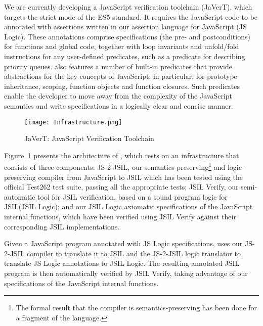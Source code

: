 \documentclass{llncs}
\newcommand{\jsil}{JSIL\xspace}
\newcommand{\JSComp}{JS-2-JSIL\xspace}
\newif\ifComments
\newcommand{\pg}[1]{%
\ifComments
\begin{center}
\fbox{%
\begin{minipage}{\textwidth} \color{red}
{\bf PG:} {\rm #1}
\end{minipage}
}
\end{center}
\fi
}
\begin{document}
We are currently developing a JavaScript verification toolchain
(JaVerT), which targets the strict mode of the ES5 standard.
It requires
the JavaScript code to be annotated with assertions written in our
assertion language for JavaScript (JS Logic).  These annotations
comprise specifications (the pre- and postconditions) for
functions and global code, together with loop invariants and unfold/fold instructions
for any user-defined predicates, such as a predicate for describing
priority queues. 
\javert also  features a number of built-in predicates that provide abstractions for the key concepts of JavaScript; 
in particular, for prototype inheritance, scoping, function objects and function closures. 
Such predicates enable the developer  to move away from the complexity of the JavaScript semantics and write specifications in a logically clear and concise manner.

\begin{figure}[!h]
\centering
\texttt{[image: Infrastructure.png]}
\vspace*{-0.2cm}
\caption{JaVerT: JavaScript Verification Toolchain}
\label{fig:javert}
\end{figure}


Figure~\ref{fig:javert} presents the architecture of \javert, which 
rests on an infrastructure that consists of three components: 
\JSComp, our semantics-preserving\footnote{The formal result
  that the compiler is semantics-preserving has been done for a
 fragment of the language.} and logic-preserving compiler from JavaScript to
\jsil which has been tested using the official Test262 test suite,
passing all the appropriate tests;  JSIL Verify, our semi-automatic tool for \jsil
verification, based on 
a sound program logic for \jsil (\jsil Logic); and  our 
JSIL Logic axiomatic specifications of the JavaScript internal functions, 
which have been verified using JSIL Verify against their
corresponding \jsil implementations.  


Given a JavaScript program annotated with JS Logic specifications, \javert uses our \JSComp compiler to translate it to \jsil and the \JSComp logic translator to translate JS Logic annotations to \jsil Logic.
The resulting annotated JSIL program is then automatically verified by
JSIL Verify, taking advantage of our specifications of the JavaScript
internal functions.
\end{document}

